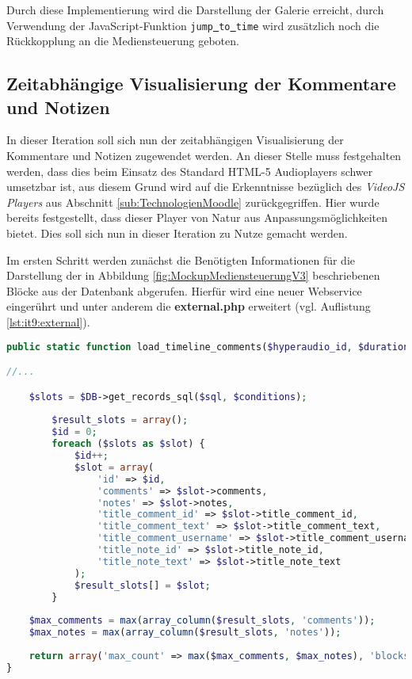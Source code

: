 Durch diese Implementierung wird die Darstellung der Galerie erreicht, durch Verwendung der JavaScript-Funktion \texttt{jump\underline{{ }}to\underline{{ }}time} wird zusätzlich noch die Rückkopplung an die Mediensteuerung geboten.

\subsection{Zeitabhängige Visualisierung der Kommentare und Notizen}
In dieser Iteration soll sich nun der zeitabhängigen Visualisierung der Kommentare und Notizen zugewendet werden. An dieser Stelle muss festgehalten werden, dass dies beim Einsatz des Standard HTML-5 Audioplayers schwer umsetzbar ist, aus diesem Grund wird auf die Erkenntnisse bezüglich des \textit{VideoJS Players} aus Abschnitt \ref{sub:TechnologienMoodle} zurückgegriffen. Hier wurde bereits festgestellt, dass dieser Player von Natur aus Anpassungsmöglichkeiten bietet. Dies soll sich nun in dieser Iteration zu Nutze gemacht werden.

Im ersten Schritt werden zunächst die Benötigten Informationen für die Darstellung der in Abbildung \ref{fig:MockupMediensteuerungV3} beschriebenen Blöcke aus der Datenbank abgerufen. Hierfür wird eine neuer Webservice eingerührt und unter anderem  die \textbf{external.php} erweitert (vgl. Auflistung \ref{lst:it9:external}).

\begin{lstlisting}[language=php,
             linewidth=\textwidth,
             caption={Ausschnitt der \textbf{external.php} in der 9. Iteration},
             label={lst:it9:external}]
public static function load_timeline_comments($hyperaudio_id, $duration, $number_of_slots) {

//...

    $slots = $DB->get_records_sql($sql, $conditions);
        
        $result_slots = array();
        $id = 0;
        foreach ($slots as $slot) {
            $id++;
            $slot = array(
                'id' => $id,
                'comments' => $slot->comments,
                'notes' => $slot->notes,
                'title_comment_id' => $slot->title_comment_id,
                'title_comment_text' => $slot->title_comment_text,
                'title_comment_username' => $slot->title_comment_username,
                'title_note_id' => $slot->title_note_id,
                'title_note_text' => $slot->title_note_text
            );
            $result_slots[] = $slot;
        }
        
    $max_comments = max(array_column($result_slots, 'comments'));
    $max_notes = max(array_column($result_slots, 'notes'));
        
    return array('max_count' => max($max_comments, $max_notes), 'blocks' => $result_slots);
}
\end{lstlisting}


